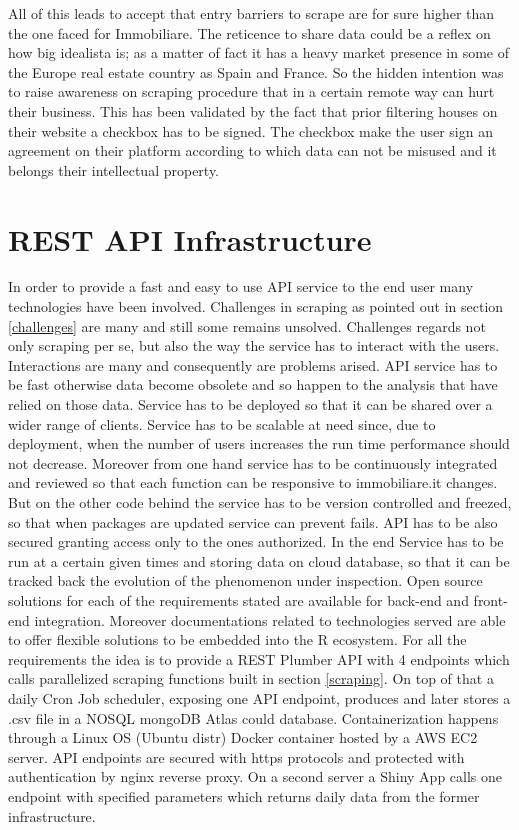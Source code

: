 \documentclass[
  12pt,
  a4paper,
  oneside]{book}
\theoremstyle{definition}
\theoremstyle{definition}
\theoremstyle{definition}
\theoremstyle{remark}
\begin{document}
All of this leads to accept that entry barriers to scrape are for sure higher than the one faced for Immobiliare. The reticence to share data could be a reflex on how big idealista is; as a matter of fact it has a heavy market presence in some of the Europe real estate country as Spain and France. So the hidden intention was to raise awareness on scraping procedure that in a certain remote way can hurt their business. This has been validated by the fact that prior filtering houses on their website a checkbox has to be signed. The checkbox make the user sign an agreement on their platform according to which data can not be misused and it belongs their intellectual property.

\hypertarget{Infrastructure}{%
\chapter{REST API Infrastructure}\label{Infrastructure}}

In order to provide a fast and easy to use API service to the end user many technologies have been involved. Challenges in scraping as pointed out in section \ref{challenges} are many and still some remains unsolved. Challenges regards not only scraping per se, but also the way the service has to interact with the users. Interactions are many and consequently are problems arised. API service has to be fast otherwise data become obsolete and so happen to the analysis that have relied on those data. Service has to be deployed so that it can be shared over a wider range of clients. Service has to be scalable at need since, due to deployment, when the number of users increases the run time performance should not decrease. Moreover from one hand service has to be continuously integrated and reviewed so that each function can be responsive to immobiliare.it changes. But on the other code behind the service has to be version controlled and freezed, so that when packages are updated service can prevent fails. API has to be also secured granting access only to the ones authorized. In the end Service has to be run at a certain given times and storing data on cloud database, so that it can be tracked back the evolution of the phenomenon under inspection.
Open source solutions for each of the requirements stated are available for back-end and front-end integration. Moreover documentations related to technologies served are able to offer flexible solutions to be embedded into the R ecosystem.
For all the requirements the idea is to provide a REST Plumber API with 4 endpoints which calls parallelized scraping functions built in section \ref{scraping}. On top of that a daily Cron Job scheduler, exposing one API endpoint, produces and later stores a .csv file in a NOSQL mongoDB Atlas could database. Containerization happens through a Linux OS (Ubuntu distr) Docker container hosted by a AWS EC2 server. API endpoints are secured with https protocols and protected with authentication by nginx reverse proxy. On a second server a Shiny App calls one endpoint with specified parameters which returns daily data from the former infrastructure.
\end{document}

